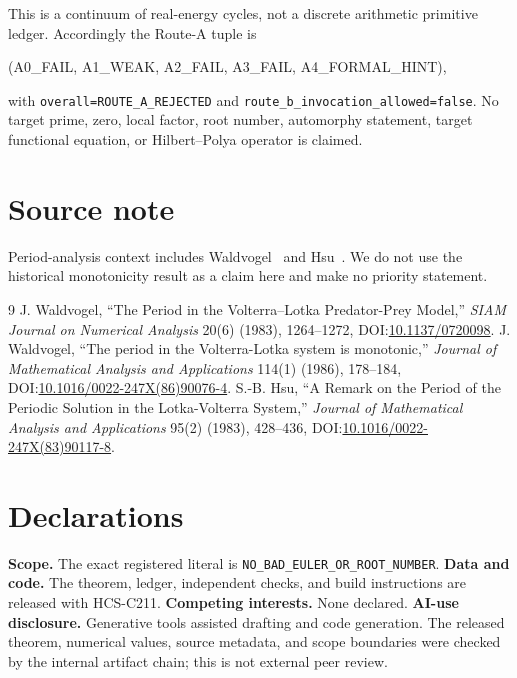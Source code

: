 \documentclass[11pt]{article}
\begin{document}
This is a continuum of real-energy cycles, not a discrete arithmetic primitive
ledger.  Accordingly the Route-A tuple is
\begin{center}\small\ttfamily
(A0\_FAIL, A1\_WEAK, A2\_FAIL, A3\_FAIL, A4\_FORMAL\_HINT),
\end{center}
with \texttt{overall=ROUTE\_A\_REJECTED} and
\texttt{route\_b\_invocation\_allowed=false}.  No target prime, zero,
local factor, root number, automorphy statement, target functional equation,
or Hilbert--Polya operator is claimed.
\fi

\section*{Source note}
Period-analysis context includes Waldvogel~\cite{waldvogel1983, waldvogel1986}
and Hsu~\cite{hsu1983}.  We do not use the historical monotonicity result as a
claim here and make no priority statement.
\begin{thebibliography}{9}
 J. Waldvogel, ``The Period in the Volterra--Lotka
Predator-Prey Model,'' \emph{SIAM Journal on Numerical Analysis} 20(6)
(1983), 1264--1272, DOI:\href{https://doi.org/10.1137/0720098}{10.1137/0720098}.
 J. Waldvogel, ``The period in the Volterra-Lotka system
is monotonic,'' \emph{Journal of Mathematical Analysis and Applications} 114(1)
(1986), 178--184, DOI:\href{https://doi.org/10.1016/0022-247X(86)90076-4}{10.1016/0022-247X(86)90076-4}.
 S.-B. Hsu, ``A Remark on the Period of the Periodic Solution
in the Lotka-Volterra System,'' \emph{Journal of Mathematical Analysis and
Applications} 95(2) (1983), 428--436,
DOI:\href{https://doi.org/10.1016/0022-247X(83)90117-8}{10.1016/0022-247X(83)90117-8}.
\end{thebibliography}

\section*{Declarations}
\textbf{Scope.} The exact registered literal is
\texttt{NO\_BAD\_EULER\_OR\_ROOT\_NUMBER}.
\textbf{Data and code.} The theorem, ledger, independent checks, and build
instructions are released with HCS-C211.
\textbf{Competing interests.} None declared.
\textbf{AI-use disclosure.} Generative tools assisted drafting and code
generation.  The released theorem, numerical values, source metadata, and
scope boundaries were checked by the internal artifact chain; this is not
external peer review.
\end{document}
